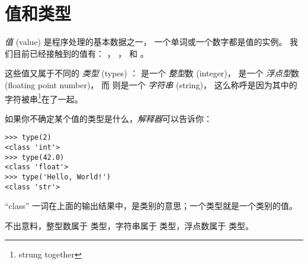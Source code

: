 \section{值和类型}
    
    
\label{value_types}


{\em 值} (value) 是程序处理的基本数据之一， 一个单词或一个数字都是值的实例。  
我们目前已经接触到的值有：  ，  ， 和  。  


这些值又属于不同的 {\em 类型} (types) ： 
 是一个 {\em 整型}数 (integer)， 
 是一个 {\em 浮点型}数 (floating point number)， 
而  则是一个  {\em 字符串} (string)， 
这么称呼是因为其中的字符被串\footnote{strung together}在了一起。

  
  


如果你不确定某个值的类型是什么，{\em 解释器}可以告诉你：

\begin{lstlisting}
>>> type(2)
<class 'int'>
>>> type(42.0)
<class 'float'>
>>> type('Hello, World!')
<class 'str'>
\end{lstlisting}

%

``class'' 一词在上面的输出结果中，是类别的意思；一个类型就是一个类别的值。
  


不出意料，整型数属于  类型，字符串属于  类型，浮点数属于  类型。
    
    
    
    

